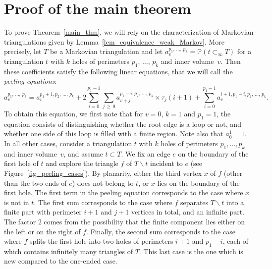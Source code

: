 \documentclass[10pt]{amsart}
\theoremstyle{definition}\newtheorem{defi}[theo]{Definition}\newtheorem{rema}[theo]{Remark}\newtheorem{exam}[theo]{Example}\newtheorem{exem}[theo]{Example}\newtheorem{nota}[theo]{Notation}
\renewcommand{\P}{\mathbb{P}}
\begin{document}
\section{Proof of the main theorem}
To prove Theorem~\ref{main_thm}, we will rely on the characterization of Markovian triangulations given by Lemma~\ref{lem_equivalence_weak_Markov}. More precisely, let $T$ be a Markovian triangulation and let $a^{p_1,\,\dots,\,p_k}_v=\P \left(t \subset_{\infty} T \right)$ for a triangulation $t$ with $k$ holes of perimeters $p_1,\,\dots,\, p_k$ and inner volume~$v$. Then these coefficients satisfy the following linear equations, that we will call the \emph{peeling equations}:
\[
a^{p_1,\,\dots,\,p_k}_v = a^{p_1+1,p_2,\,\dots,\,p_k}_{v} + 2 \sum_{i=0}^{p_1-1} \sum_{j\,\geq\,0} a^{p_1-i,p_2,\,\dots,\,p_k}_{v+j} \times \tau_j(i+1) + \sum_{i=0}^{p_1-1} a^{i+1, p_1-i, p_2,\,\dots,\,p_k}_{v}.
\]
To obtain this equation, we first note that for $v=0$, $k=1$ and $p_1=1$, the equation consists of distinguishing whether the root edge is a loop or not, and whether one side of this loop is filled with a finite region. Note also that $a^1_0=1$. In all other cases, consider a triangulation $t$ with $k$ holes of perimeters $p_1, \dots, p_k$ and inner volume~$v$, and assume $t \subset T$. We fix an edge $e$ on the boundary of the first hole of $t$ and explore the triangle $f$ of $T \backslash t$ incident to $e$ (see Figure~\ref{fig_peeling_cases}). By planarity, either the third vertex $x$ of $f$ (other than the two ends of $e$) does not belong to $t$, or $x$ lies on the boundary of the first hole. The first term in the peeling equation corresponds to the case where $x$ is not in $t$. The first sum corresponds to the case where $f$ separates $T \backslash t$ into a finite part with perimeter $i+1$ and $j+1$ vertices in total, and an infinite part. The factor $2$ comes from the possibility that the finite component lies either on the left or on the right of $f$. Finally, the second sum corresponds to the case where $f$ splits the first hole into two holes of perimeters $i+1$ and $p_1-i$, each of which contains infinitely many triangles of $T$. This last case is the one which is new compared to the one-ended case.
\end{document}
